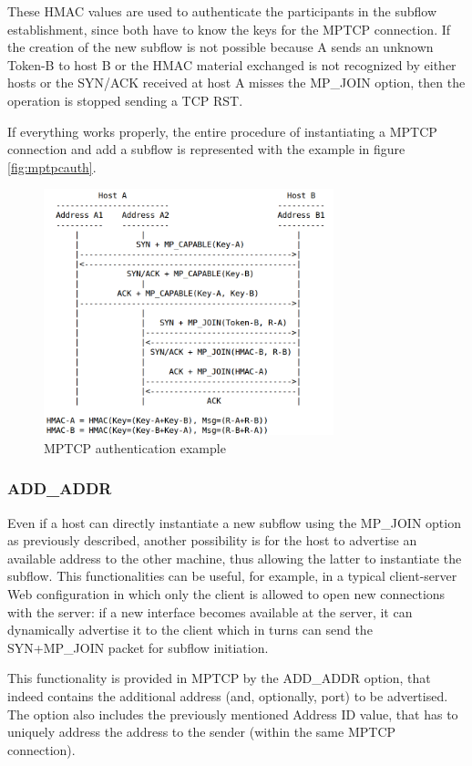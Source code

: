 These HMAC values are used to authenticate the participants in the subflow establishment, since both have to know the keys for the MPTCP connection. If the creation of the new subflow is not possible because A sends an unknown Token-B to host B or the HMAC material exchanged is not recognized by either hosts or the SYN/ACK received at host A misses the MP\_JOIN option, then the operation is stopped sending a TCP RST.


If everything works properly, the entire procedure of instantiating a MPTCP connection and add a subflow is represented with the example in figure \ref{fig:mptpcauth}. 

\begin{figure}[!htb]
\centering
\includegraphics[width=0.75\textwidth]{images/mptcpauth}
\caption{MPTCP authentication example}
\label{fig:mptcpauth}
\end{figure}


\subsubsection{ADD\_ADDR}
Even if a host can directly instantiate a new subflow using the MP\_JOIN option as previously described, another possibility is for the host to advertise an available address to the other machine, thus allowing the latter to instantiate the subflow.
This functionalities can be useful, for example, in a typical client-server Web configuration in which only the client is allowed to open new connections with the server: if a new interface becomes available at the server, it can dynamically advertise it to the client which in turns can send the SYN+MP\_JOIN packet for subflow initiation.


This functionality is provided in MPTCP by the ADD\_ADDR option, that indeed contains the additional address (and, optionally, port) to be advertised. The option also includes the previously mentioned Address ID value, that has to uniquely address the address to the sender (within the same MPTCP connection).


